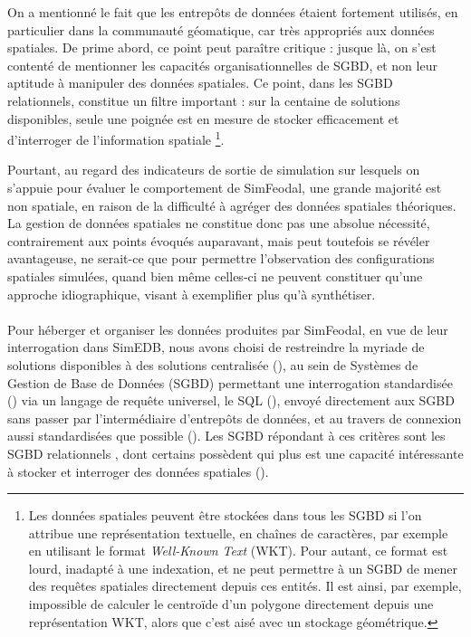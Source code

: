 			On a mentionné le fait que les entrepôts de données étaient fortement utilisés, en particulier dans la communauté géomatique, car très appropriés aux données spatiales.
			De prime abord, ce point peut paraître critique : jusque là, on s'est contenté de mentionner les capacités organisationnelles de SGBD, et non leur aptitude à manipuler des données spatiales.
			Ce point, dans les SGBD relationnels, constitue un filtre important : sur la centaine de solutions disponibles, seule une poignée est en mesure de stocker efficacement et d'interroger de l'information spatiale \footnote{
				Les données spatiales peuvent être stockées dans tous les SGBD si l'on attribue une représentation textuelle, en chaînes de caractères, par exemple en utilisant le format \textit{Well-Known Text} (WKT). Pour autant, ce format est lourd, inadapté à une indexation, et ne peut permettre à un SGBD de mener des requêtes spatiales directement depuis ces entités. Il est ainsi, par exemple, impossible de calculer le centroïde d'un polygone directement depuis une représentation WKT, alors que c'est aisé avec un stockage géométrique.
			}.

			Pourtant, au regard des indicateurs de sortie de simulation sur lesquels on s'appuie pour évaluer le comportement de SimFeodal, une grande majorité est non spatiale, en raison de la difficulté à agréger des données spatiales théoriques.
			La gestion de données spatiales ne constitue donc pas une absolue nécessité, contrairement aux points évoqués auparavant, mais peut toutefois se révéler avantageuse, ne serait-ce que pour permettre l'observation des configurations spatiales simulées, quand bien même celles-ci ne peuvent constituer qu'une approche idiographique, visant à exemplifier plus qu'à synthétiser.

			\paragraph*{}
			Pour héberger et organiser les données produites par SimFeodal, en vue de leur interrogation dans SimEDB, nous avons choisi de restreindre la myriade de solutions disponibles à des solutions centralisée (), au sein de Systèmes de Gestion de Base de Données (SGBD) permettant une interrogation standardisée () via un langage de requête universel, le SQL (), envoyé directement aux SGBD sans passer par l'intermédiaire d'entrepôts de données, et au travers de connexion aussi standardisées que possible ().
			Les SGBD répondant à ces critères sont les SGBD \og relationnels \fg{}, dont certains possèdent qui plus est une capacité intéressante à stocker et interroger des données spatiales ().


